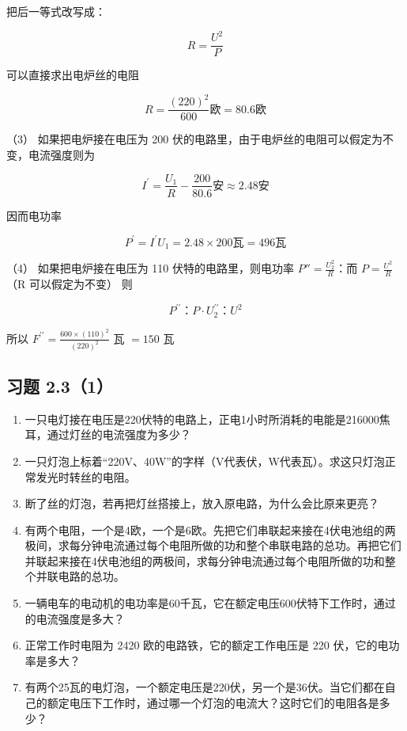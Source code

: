 把后一等式改写成：

\[
R = \frac{U^{2}}{P}
\]

可以直接求出电炉丝的电阻

\[
R = \frac{(220)^{2}}{600} \text{欧} = 80.6 \text{欧}
\]

（3） 如果把电炉接在电压为 200
伏的电路里，由于电炉丝的电阻可以假定为不变，电流强度则为

\[
I^{\prime} = \frac{U_{1}}{R} - \frac{200}{80.6} \text{安} \approx 2.48 \text{安}
\]

因而电功率

\[
P^{\prime} = I^{\prime} U_{1} = 2.48 \times 200 \text{瓦} = 496 \text{瓦}
\]

（4） 如果把电炉接在电压为 110 伏特的电路里，则电功率
\(P'' = \frac{U_{2}^{2}}{R}\)：而 \(P = \frac{U^{2}}{R}\) （R
可以假定为不变） 则

\[
P^{\prime \prime}\text{：} P \cdot U_{2}^{\prime \prime}\text{：} U^{2}
\]

所以 \(F^{\prime \prime} = \frac{600\times(110)^{2}}{(220)^{2}}\) 瓦
\(= 150\) 瓦

\subsection{习题 2.3（1）}\label{ux4e60ux9898-2.31}

\begin{enumerate}
\def\labelenumi{\arabic{enumi}.}
\item
  一只电灯接在电压是220伏特的电路上，正电1小时所消耗的电能是216000焦耳，通过灯丝的电流强度为多少？
\item
  一只灯泡上标着``220V、40W''的字样（V代表伏，W代表瓦）。求这只灯泡正常发光时转丝的电阻。
\item
  断了丝的灯泡，若再把灯丝搭接上，放入原电路，为什么会比原来更亮？
\item
  有两个电阻，一个是4欧，一个是6欧。先把它们串联起来接在4伏电池组的两极间，求每分钟电流通过每个电阻所做的功和整个串联电路的总功。再把它们并联起来接在4伏电池组的两极间，求每分钟电流通过每个电阻所做的功和整个并联电路的总功。
\item
  一辆电车的电动机的电功率是60千瓦，它在额定电压600伏特下工作时，通过的电流强度是多大？
\item
  正常工作时电阻为 2420 欧的电路铁，它的额定工作电压是 220
  伏，它的电功率是多大？
\item
  有两个25瓦的电灯泡，一个额定电压是220伏，另一个是36伏。当它们都在自己的额定电压下工作时，通过哪一个灯泡的电流大？这时它们的电阻各是多少？
\end{enumerate}

